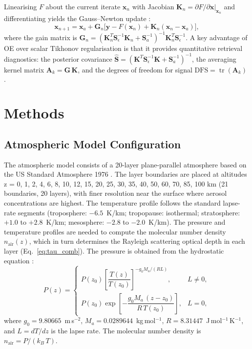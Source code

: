 \documentclass[a4paper, 11pt]{article}
\begin{document}
Linearising $F$ about the current iterate $\mathbf{x}_n$ with
Jacobian $\mathbf{K}_n = \partial F / \partial \mathbf{x}|_{\mathbf{x}_n}$
and differentiating yields the Gauss--Newton update \cite{rodgers2000}:
%
\begin{equation}
  \mathbf{x}_{n+1} = \mathbf{x}_a
  + \mathbf{G}_n\bigl[\mathbf{y} - F(\mathbf{x}_n)
  + \mathbf{K}_n(\mathbf{x}_n - \mathbf{x}_a)\bigr],
  \label{eq:oe_update}
\end{equation}
%
where the gain matrix is
$\mathbf{G}_n = (\mathbf{K}_n^T \mathbf{S}_\epsilon^{-1} \mathbf{K}_n
+ \mathbf{S}_a^{-1})^{-1}\mathbf{K}_n^T\mathbf{S}_\epsilon^{-1}$.
A key advantage of OE over scalar Tikhonov regularisation is that it
provides quantitative retrieval diagnostics: the posterior covariance
$\hat{\mathbf{S}} = (\mathbf{K}^T\mathbf{S}_\epsilon^{-1}\mathbf{K}
+ \mathbf{S}_a^{-1})^{-1}$, the averaging kernel matrix
$\mathbf{A}_k = \mathbf{G}\,\mathbf{K}$, and the degrees of freedom
for signal $\text{DFS} = \operatorname{tr}(\mathbf{A}_k)$
\cite{rodgers2000}.
\section{Methods}
\label{sec:methods}

\subsection{Atmospheric Model Configuration}
\label{sec:atm_model}

The atmospheric model consists of a 20-layer plane-parallel atmosphere
based on the US Standard Atmosphere 1976 \cite{usatm1976}.  The layer
boundaries are placed at altitudes z = 0, 1, 2, 4, 6, 8, 10, 12, 15, 20, 25, 30, 35, 40, 50, 60, 70, 85, 100 km (21 boundaries, 20 layers), with finer resolution near the surface where
aerosol concentrations are highest.  The temperature profile follows
the standard lapse-rate segments (troposphere: $-6.5$~K/km;
tropopause: isothermal; stratosphere: $+1.0$ to $+2.8$~K/km;
mesosphere: $-2.8$ to $-2.0$~K/km).  The pressure and temperature
profiles are needed to compute the molecular number density
$n_{\text{air}}(z)$, which in turn determines the Rayleigh scattering
optical depth in each layer (Eq.~\ref{eq:tau_comb}).  The pressure is
obtained from the hydrostatic equation \cite{usatm1976}:
%
\begin{equation}
  P(z) = \begin{cases}
    P(z_0)\left[\dfrac{T(z)}{T(z_0)}\right]^{-g_0 M_a/(RL)},
    & L \neq 0, \\[8pt]
    P(z_0)\exp\!\left[-\dfrac{g_0 M_a\,(z-z_0)}{R\,T(z_0)}\right],
    & L = 0,
  \end{cases}
  \label{eq:hydrostatic}
\end{equation}
%
where $g_0 = 9.80665$~m\,s$^{-2}$, $M_a = 0.0289644$~kg\,mol$^{-1}$,
$R = 8.31447$~J\,mol$^{-1}$\,K$^{-1}$, and $L = dT/dz$ is the lapse
rate.  The molecular number density is $n_{\text{air}} = P/(k_B\,T)$.
\end{document}
